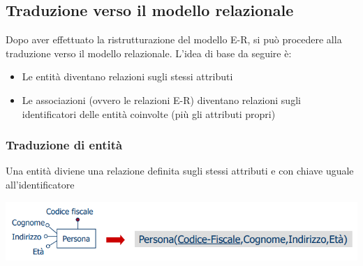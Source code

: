 \documentclass[12pt]{article}
\begin{document}
\subsection{Traduzione verso il modello relazionale}
Dopo aver effettuato la ristrutturazione del modello E-R, si può procedere alla traduzione verso il modello relazionale.
L'idea di base da seguire è:
\begin{itemize}
    \item Le entità diventano relazioni sugli stessi attributi
    \item Le associazioni (ovvero le relazioni E-R) diventano relazioni sugli identificatori delle entità coinvolte (più gli attributi propri)
\end{itemize}
\subsubsection{Traduzione di entità}
Una entità diviene una relazione definita sugli stessi attributi e con chiave uguale all'identificatore
\begin{center}
    \includegraphics[width = 1\textwidth]{Images/112.PNG}
\end{center}
\end{document}
